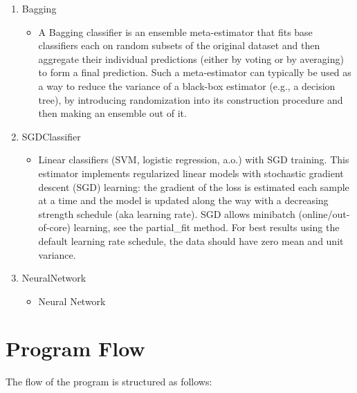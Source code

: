 \begin{enumerate}
\begin{itemize}
        \end{itemize}
    \item Bagging
        \begin{itemize}
            \item A Bagging classifier is an ensemble meta-estimator that fits base classifiers each on random subsets of the original dataset and then aggregate their individual predictions (either by voting or by averaging) to form a final prediction. Such a meta-estimator can typically be used as a way to reduce the variance of a black-box estimator (e.g., a decision tree), by introducing randomization into its construction procedure and then making an ensemble out of it.
        \end{itemize}
    \item SGDClassifier
        \begin{itemize}
            \item Linear classifiers (SVM, logistic regression, a.o.) with SGD training. This estimator implements regularized linear models with stochastic gradient descent (SGD) learning: the gradient of the loss is estimated each sample at a time and the model is updated along the way with a decreasing strength schedule (aka learning rate). SGD allows minibatch (online/out-of-core) learning, see the partial\_fit method. For best results using the default learning rate schedule, the data should have zero mean and unit variance.
        \end{itemize}
    \item NeuralNetwork
        \begin{itemize}
            \item Neural Network
        \end{itemize}
\end{enumerate}

\section{Program Flow}

The flow of the program is structured as follows:

